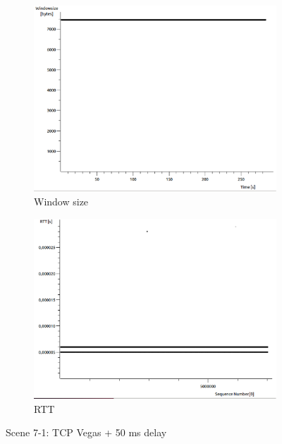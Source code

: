 \documentclass[conference,a4paper]{../../sty/IEEEtran}
\begin{document}
\begin{figure}
\begin{subfigure}[b]{0.2\textwidth}
  \includegraphics[width=\textwidth]{s7-1_wsize}
  \caption{Window size}
 \end{subfigure}
 \begin{subfigure}[b]{0.2\textwidth}
  \includegraphics[width=\textwidth]{s7-1_rtt}
  \caption{RTT}
 \end{subfigure}
 \caption{Scene 7-1: TCP Vegas + 50 ms delay}
\end{figure}
\end{document}
